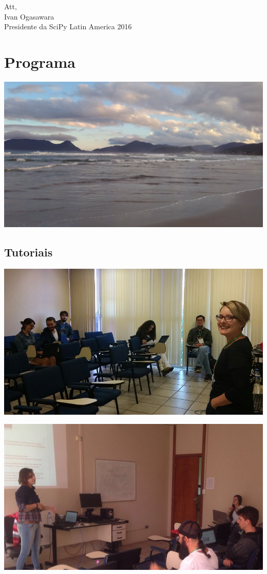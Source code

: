 \documentclass[12pt]{article}
\begin{document}
Att, \\
\indent Ivan Ogasawara \\
\indent Presidente da SciPy Latin America 2016


\newpage

\section*{Programa}

\noindent  %
\includegraphics[width=\textwidth]{venue-beach.jpg}


\subsection*{Tutoriais}

\noindent  %
\includegraphics[width=\textwidth]{tutorial-latex.jpg}

\noindent  %
\includegraphics[width=\textwidth]{tutorial-pyopencl.jpg}
\end{document}
